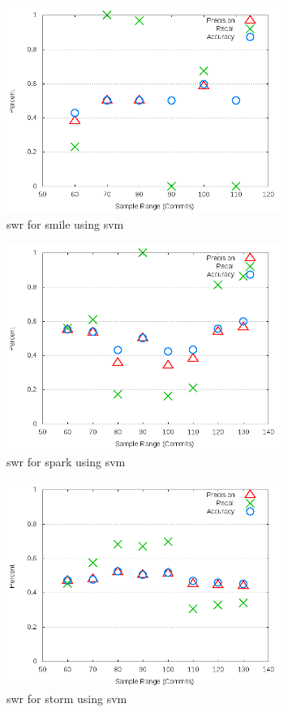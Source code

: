 \begin{figure}[!t]
\centering
\includegraphics[width=0.8\textwidth]{images/svm/test_1/smile_sample_range.png}
\caption{\gls{swr} for smile using \gls{svm}}
\label{fig:test_1_smile_svm}
\end{figure}

\begin{figure}[!t]
\centering
\includegraphics[width=0.8\textwidth]{images/svm/test_1/spark_sample_range.png}
\caption{\gls{swr} for spark using \gls{svm}}
\label{fig:test_1_spark_svm}
\end{figure}

\begin{figure}[!t]
\centering
\includegraphics[width=0.8\textwidth]{images/svm/test_1/storm_sample_range.png}
\caption{\gls{swr} for storm using \gls{svm}}
\label{fig:test_1_storm_svm}
\end{figure}

